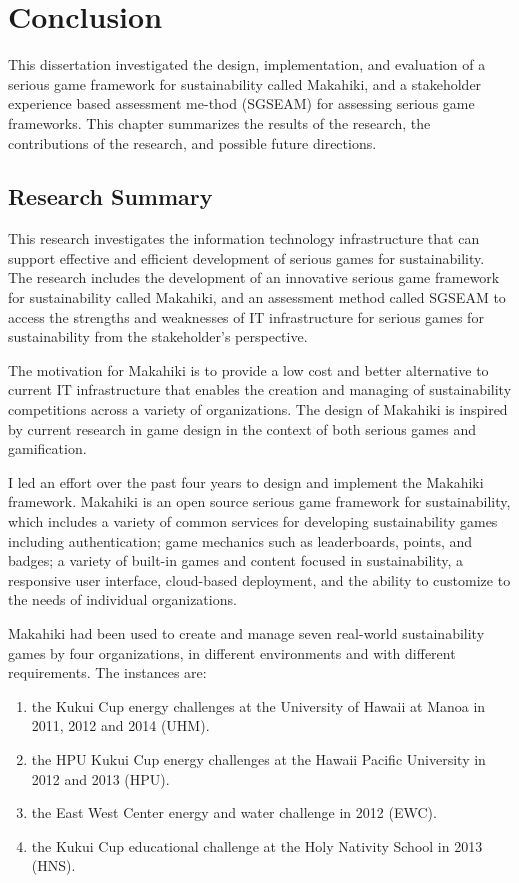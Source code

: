 \chapter{Conclusion}
\label{cha:conclusion}

This dissertation investigated the design, implementation, and evaluation of a serious game framework for sustainability called Makahiki, and a stakeholder experience based assessment me-thod (SGSEAM) for assessing serious game frameworks. This chapter summarizes the results of the research, the contributions of the research, and possible future directions.

\section{Research Summary}

This research investigates the information technology infrastructure that can support effective and efficient development of serious games for sustainability. The research includes the development of an innovative serious game framework for sustainability called Makahiki, and an assessment method called SGSEAM to access the strengths and weaknesses of IT infrastructure for serious games for sustainability from the stakeholder's perspective.

The motivation for Makahiki is to provide a low cost and better alternative to current IT infrastructure that enables the creation and managing of sustainability competitions across a variety of organizations. The design of Makahiki is inspired by current research in game design in the context of both serious games and gamification. 

I led an effort over the past four years to design and implement the Makahiki framework. Makahiki is an open source serious game framework for sustainability, which includes a variety of common services for developing sustainability games including authentication; game mechanics such as leaderboards, points, and badges; a variety of built-in games and content focused in sustainability, a responsive user interface, cloud-based deployment, and the ability to customize to the needs of individual organizations.

Makahiki had been used to create and manage seven real-world sustainability games by four organizations, in different environments and with different requirements. The instances are: 
\begin{enumerate}
\item the Kukui Cup energy challenges at the University of Hawaii at Manoa in 2011, 2012 and 2014 (UHM).
\item the HPU Kukui Cup energy challenges at the Hawaii Pacific University in 2012 and 2013 (HPU).
\item the East West Center energy and water challenge in 2012 (EWC).
\item the Kukui Cup educational challenge at the Holy Nativity School in 2013 (HNS). 
\end{enumerate}

